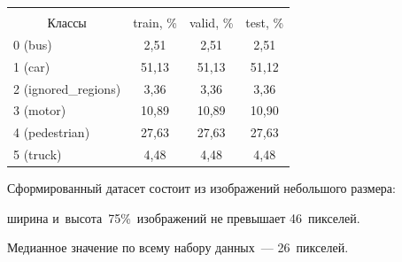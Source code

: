   \begin{table}\small %


  \begin{center}




  \vspace*{2ex}





\begin{tabular}{|l|c|c|c|}


&&&\\[-9pt]


\hline


&&&\\[-9pt]


  \multicolumn{1}{|c|}{Классы }&train, \%&valid, \%&test, \%\\


  \hline


  0 (bus)&\hphantom{9}2,51&\hphantom{9}2,51&\hphantom{9}2,51\\


  1 (car)&51,13&51,13&51,12\\


  2 (ignored\_regions)&\hphantom{9}3,36&\hphantom{9}3,36&\hphantom{9}3,36\\


  3 (motor)&10,89&10,89&10,90\\


  4 (pedestrian)&27,63&27,63&27,63\\


  5 (truck)&\hphantom{9}4,48&\hphantom{9}4,48&\hphantom{9}4,48\\


  \hline


  \end{tabular}


  \end{center}


    \vspace*{-6pt}


  \end{table}


  


  Сформированный датасет состоит из изображений небольшого размера: 


ширина и~высота~75\%~изоб\-ра\-же\-ний не превышает 46~пикселей. 


Медианное значение по всему набору данных~--- 26~пикселей.





